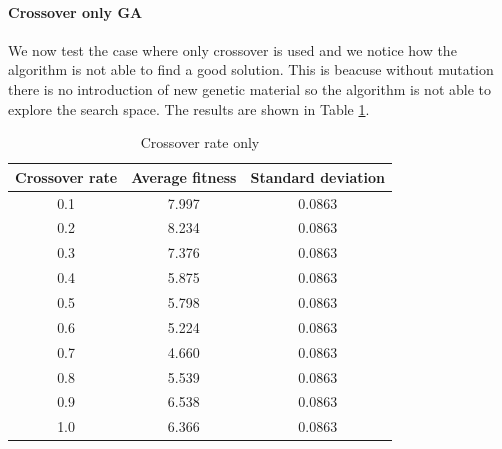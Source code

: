 \paragraph*{Crossover only GA}
We now test the case where only crossover is used and we notice how the algorithm is not able to find a good solution. This is beacuse without mutation there is no introduction of new genetic material so the algorithm is not able to explore the search space. The results are shown in Table \ref{tab:crossover_rate}.
\begin{table}[H]
    \centering
    \begin{tabular}{|c|c|c|}
        Crossover rate & Average fitness & Standard deviation \\ \hline
        0.1            & 7.997           & 0.0863             \\
        0.2            & 8.234           & 0.0863             \\
        0.3            & 7.376           & 0.0863             \\
        0.4            & 5.875           & 0.0863             \\
        0.5            & 5.798           & 0.0863             \\
        0.6            & 5.224           & 0.0863             \\
        0.7            & 4.660           & 0.0863             \\
        0.8            & 5.539           & 0.0863             \\
        0.9            & 6.538           & 0.0863             \\
        1.0            & 6.366           & 0.0863             \\
    \end{tabular}
    \caption{Crossover rate only}
    \label{tab:crossover_rate}
\end{table}

